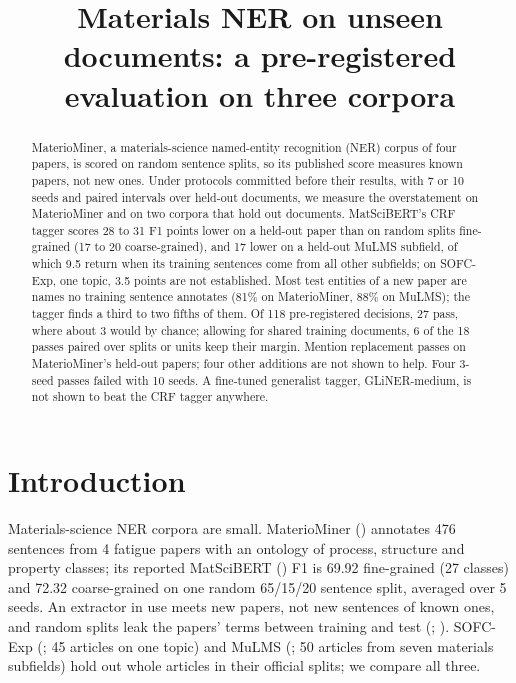 \documentclass[11pt,a4paper]{article}
\title{Materials NER on unseen documents: a pre-registered evaluation on three corpora}
\author{}
\date{}
\begin{document}
\maketitle
\begin{abstract}
MaterioMiner, a materials-science named-entity recognition (NER) corpus of
four papers, is scored on random sentence splits, so its published score
measures known papers, not new ones. Under protocols committed before
their results, with 7 or 10 seeds and paired intervals over held-out
documents, we measure the overstatement on MaterioMiner and on two corpora
that hold out documents. MatSciBERT's CRF tagger scores 28 to 31 F1 points
lower on a held-out paper than on random splits fine-grained (17 to 20
coarse-grained), and 17 lower on a held-out MuLMS subfield, of which 9.5
return when its training sentences come from all other subfields; on
SOFC-Exp, one topic, 3.5 points are not established. Most test entities of
a new paper are names no training sentence annotates (81\% on MaterioMiner,
88\% on MuLMS); the tagger finds a third to two fifths of them. Of 118
pre-registered decisions, 27 pass, where about 3 would by chance; allowing
for shared training documents, 6 of the 18 passes paired over splits or
units keep their margin. Mention replacement passes on MaterioMiner's
held-out papers; four other additions are not shown to help. Four 3-seed
passes failed with 10 seeds. A fine-tuned generalist tagger,
GLiNER-medium, is not shown to beat the CRF tagger anywhere.
\end{abstract}

\hypertarget{introduction}{%
\section{Introduction}\label{introduction}}

Materials-science NER corpora are small. MaterioMiner
(\citealp{durmaz2024materiominer}) annotates 476 sentences from 4 fatigue papers
with an ontology of process, structure and property classes; its reported
MatSciBERT (\citealp{gupta2022matscibert}) F1 is 69.92 fine-grained (27 classes) and
72.32 coarse-grained on one random 65/15/20 sentence split, averaged over
5 seeds. An extractor in use meets new papers, not new sentences of known
ones, and random splits leak the papers' terms between training and test
(\citealp{babl2025random}; \citealp{augenstein2017generalisation}). SOFC-Exp
(\citealp{friedrich2020sofc}; 45 articles on one topic) and MuLMS
(\citealp{schrader2023mulms}; 50 articles from seven materials subfields) hold out
whole articles in their official splits; we compare all three.
\end{document}
